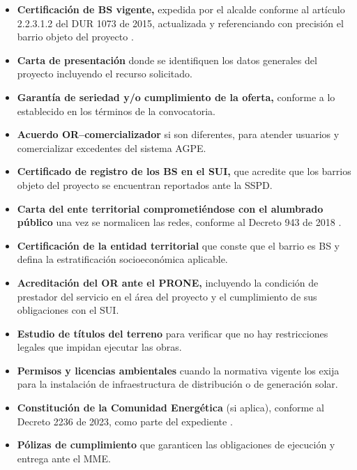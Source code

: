 \begin{itemize}
    \item \textbf{Certificación de BS vigente,} expedida por el alcalde
    conforme al artículo 2.2.3.1.2 del DUR 1073 de 2015, actualizada y
    referenciando con precisión el barrio objeto del proyecto
    \parencite{DUR1073_2015}.

    \item \textbf{Carta de presentación} donde se identifiquen los datos
    generales del proyecto incluyendo el recurso solicitado.

    \item \textbf{Garantía de seriedad y/o cumplimiento de la oferta,}
    conforme a lo establecido en los términos de la convocatoria.

    \item \textbf{Acuerdo OR--comercializador} si son diferentes, para
    atender usuarios y comercializar excedentes del sistema AGPE.

    \item \textbf{Certificado de registro de los BS en el SUI,} que
    acredite que los barrios objeto del proyecto se encuentran reportados
    ante la SSPD.

    \item \textbf{Carta del ente territorial comprometiéndose con el
    alumbrado público} una vez se normalicen las redes, conforme al
    Decreto 943 de 2018 \parencite{Decreto943_2018}.

    \item \textbf{Certificación de la entidad territorial} que conste que
    el barrio es BS y defina la estratificación socioeconómica aplicable.

    \item \textbf{Acreditación del OR ante el PRONE,} incluyendo la
    condición de prestador del servicio en el área del proyecto y el
    cumplimiento de sus obligaciones con el SUI.

    \item \textbf{Estudio de títulos del terreno} para verificar que no
    hay restricciones legales que impidan ejecutar las obras.

    \item \textbf{Permisos y licencias ambientales} cuando la normativa
    vigente los exija para la instalación de infraestructura de
    distribución o de generación solar.

    \item \textbf{Constitución de la Comunidad Energética} (si aplica),
    conforme al Decreto 2236 de 2023, como parte del expediente
    \parencite{Decreto2236_2023}.

    \item \textbf{Pólizas de cumplimiento} que garanticen las
    obligaciones de ejecución y entrega ante el MME.
\end{itemize}

